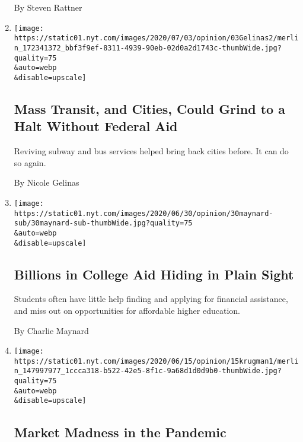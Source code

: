 \begin{enumerate}
  By Steven Rattner
\item
  \href{/2020/07/03/opinion/coronavirus-mass-transit.html}{}

  \texttt{[image: https://static01.nyt.com/images/2020/07/03/opinion/03Gelinas2/merlin\_172341372\_bbf3f9ef-8311-4939-90eb-02d0a2d1743c-thumbWide.jpg?quality=75\\\&auto=webp\\\&disable=upscale]}

  \hypertarget{mass-transit-and-cities-could-grind-to-a-halt-without-federal-aid}{%
  \subsection{Mass Transit, and Cities, Could Grind to a Halt Without
  Federal
  Aid}\label{mass-transit-and-cities-could-grind-to-a-halt-without-federal-aid}}

  Reviving subway and bus services helped bring back cities before. It
  can do so again.

  By Nicole Gelinas
\item
  \href{/2020/06/30/opinion/college-financial-aid.html}{}

  \texttt{[image: https://static01.nyt.com/images/2020/06/30/opinion/30maynard-sub/30maynard-sub-thumbWide.jpg?quality=75\\\&auto=webp\\\&disable=upscale]}

  \hypertarget{billions-in-college-aid-hiding-in-plain-sight}{%
  \subsection{Billions in College Aid Hiding in Plain
  Sight}\label{billions-in-college-aid-hiding-in-plain-sight}}

  Students often have little help finding and applying for financial
  assistance, and miss out on opportunities for affordable higher
  education.

  By Charlie Maynard
\item
  \href{/2020/06/15/opinion/coronavirus-stock-market.html}{}

  \texttt{[image: https://static01.nyt.com/images/2020/06/15/opinion/15krugman1/merlin\_147997977\_1ccca318-b522-42e5-8f1c-9a68d1d0d9b0-thumbWide.jpg?quality=75\\\&auto=webp\\\&disable=upscale]}

  \hypertarget{market-madness-in-the-pandemic}{%
  \subsection{Market Madness in the
  Pandemic}\label{market-madness-in-the-pandemic}}


\end{enumerate}
